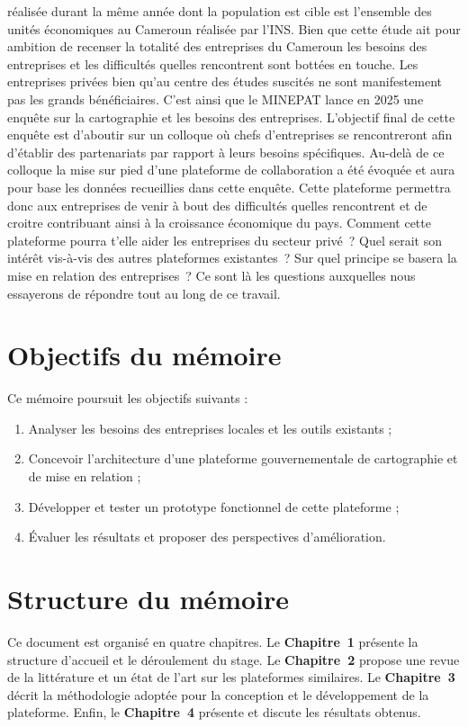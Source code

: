 \documentclass[12pt, a4paper, oneside]{report}
\begin{document}
réalisée durant la même année dont la population est cible est l’ensemble des unités économiques au Cameroun réalisée par l’INS. Bien que cette étude ait pour ambition de recenser la totalité des entreprises du Cameroun les besoins des entreprises et les difficultés quelles rencontrent sont bottées en touche. Les entreprises privées bien qu’au centre des études suscités ne sont manifestement pas les grands bénéficiaires. C’est ainsi que le MINEPAT lance en 2025 une enquête sur la cartographie et les besoins des entreprises. L’objectif final de cette enquête est d’aboutir sur un colloque où chefs d’entreprises se rencontreront afin  d’établir des partenariats par rapport à leurs besoins spécifiques. Au-delà de ce colloque la mise sur pied d’une plateforme de collaboration a été évoquée et aura pour base les données recueillies dans cette enquête. Cette plateforme permettra donc aux entreprises de venir à bout des difficultés quelles rencontrent et de croitre contribuant ainsi à la croissance économique du pays. Comment cette plateforme pourra t’elle aider les entreprises du secteur privé ? Quel serait son intérêt vis-à-vis des autres plateformes existantes ? Sur quel principe se basera la mise en relation des entreprises ? Ce sont là les questions auxquelles nous essayerons de répondre tout au long de ce travail.

\section*{Objectifs du mémoire}

Ce mémoire poursuit les objectifs suivants :

\begin{enumerate}
  \item Analyser les besoins des entreprises locales et les outils existants ;
  \item Concevoir l'architecture d'une plateforme gouvernementale de cartographie et de mise en relation ;
  \item Développer et tester un prototype fonctionnel de cette plateforme ;
  \item Évaluer les résultats et proposer des perspectives d'amélioration.
\end{enumerate}

\section*{Structure du mémoire}

Ce document est organisé en quatre chapitres. Le \textbf{Chapitre~1} présente la structure d'accueil et le déroulement du stage. Le \textbf{Chapitre~2} propose une revue de la littérature et un état de l'art sur les plateformes similaires. Le \textbf{Chapitre~3} décrit la méthodologie adoptée pour la conception et le développement de la plateforme. Enfin, le \textbf{Chapitre~4} présente et discute les résultats obtenus.
\end{document}
